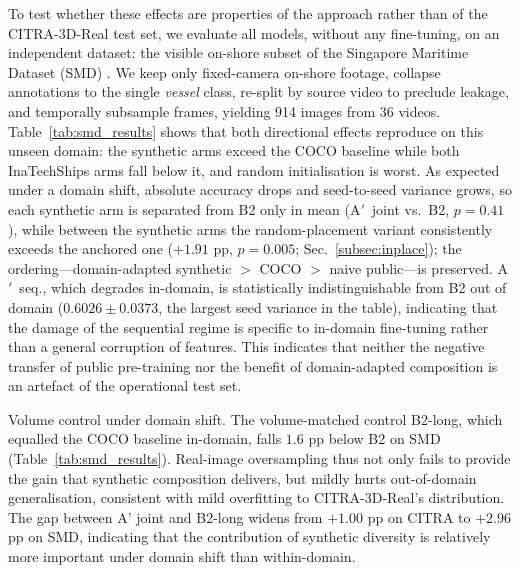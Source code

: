 \documentclass[10pt,conference]{IEEEtran}
\begin{document}
To test whether these effects are properties of the approach rather than of the
CITRA-3D-Real test set, we evaluate all models, without any fine-tuning, on an
independent dataset: the visible on-shore subset of the Singapore Maritime
Dataset (SMD) \cite{prasad2017video}. We keep only fixed-camera on-shore footage,
collapse annotations to the single \emph{vessel} class, re-split by source video
to preclude leakage, and temporally subsample frames, yielding 914 images from 36
videos. Table~\ref{tab:smd_results} shows that both directional effects reproduce on this
unseen domain: the synthetic arms exceed the COCO baseline while both InaTechShips
arms fall below it, and random initialisation is worst. As expected under a domain
shift, absolute accuracy drops and seed-to-seed variance grows, so each
synthetic arm is separated from B2 only in mean (A$'$~joint vs.\ B2, $p=0.41$),
while between the synthetic arms the random-placement variant consistently
exceeds the anchored one ($+1.91$ pp, $p=0.005$; Sec.~\ref{subsec:inplace});
the ordering---domain-adapted synthetic $>$ COCO $>$ naive public---is
preserved. A$'$~seq., which degrades in-domain, is statistically
indistinguishable from B2 out of domain ($0.6026\pm0.0373$, the largest seed
variance in the table), indicating that the damage of the sequential regime is
specific to in-domain fine-tuning rather than a general corruption of
features. This indicates that neither the negative
transfer of public pre-training nor the benefit of domain-adapted composition is
an artefact of the operational test set.

Volume control under domain shift. The volume-matched control B2-long, which equalled the COCO baseline in-domain, falls $1.6$ pp below B2 on SMD (Table~\ref{tab:smd_results}). Real-image oversampling thus not only fails to provide the gain that synthetic composition delivers, but mildly hurts out-of-domain generalisation, consistent with mild overfitting to CITRA-3D-Real's distribution. The gap between A' joint and B2-long widens from $+1.00$ pp on CITRA to $+2.96$ pp on SMD, indicating that the contribution of synthetic diversity is relatively more important under domain shift than within-domain.
\end{document}
